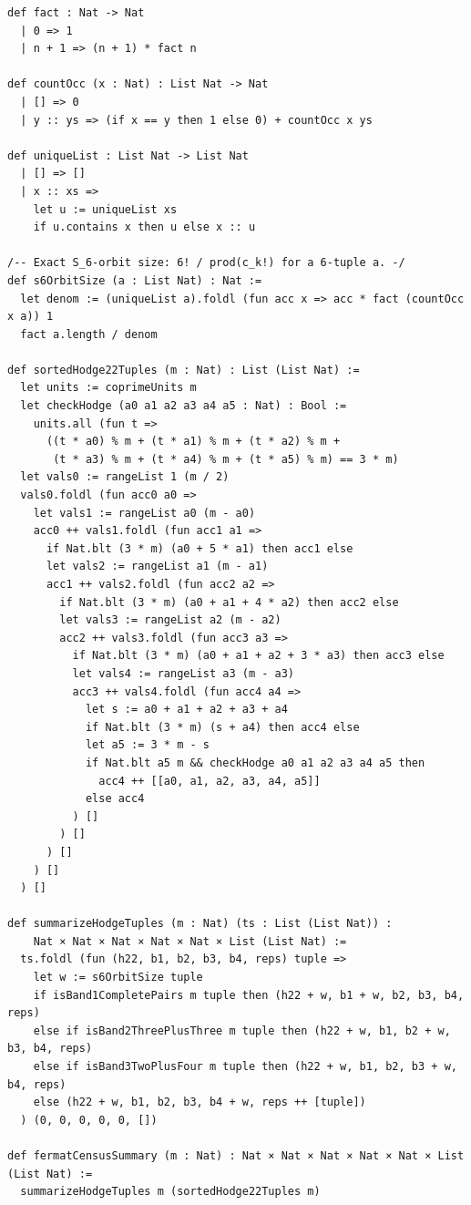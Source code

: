 \documentclass[11pt,a4paper]{article}
\begin{document}
\begin{lstlisting}[caption={Multinomial $S_6$-orbit size, sorted enumeration, and single-pass census.}]
def fact : Nat -> Nat
  | 0 => 1
  | n + 1 => (n + 1) * fact n

def countOcc (x : Nat) : List Nat -> Nat
  | [] => 0
  | y :: ys => (if x == y then 1 else 0) + countOcc x ys

def uniqueList : List Nat -> List Nat
  | [] => []
  | x :: xs =>
    let u := uniqueList xs
    if u.contains x then u else x :: u

/-- Exact S_6-orbit size: 6! / prod(c_k!) for a 6-tuple a. -/
def s6OrbitSize (a : List Nat) : Nat :=
  let denom := (uniqueList a).foldl (fun acc x => acc * fact (countOcc x a)) 1
  fact a.length / denom

def sortedHodge22Tuples (m : Nat) : List (List Nat) :=
  let units := coprimeUnits m
  let checkHodge (a0 a1 a2 a3 a4 a5 : Nat) : Bool :=
    units.all (fun t =>
      ((t * a0) % m + (t * a1) % m + (t * a2) % m +
       (t * a3) % m + (t * a4) % m + (t * a5) % m) == 3 * m)
  let vals0 := rangeList 1 (m / 2)
  vals0.foldl (fun acc0 a0 =>
    let vals1 := rangeList a0 (m - a0)
    acc0 ++ vals1.foldl (fun acc1 a1 =>
      if Nat.blt (3 * m) (a0 + 5 * a1) then acc1 else
      let vals2 := rangeList a1 (m - a1)
      acc1 ++ vals2.foldl (fun acc2 a2 =>
        if Nat.blt (3 * m) (a0 + a1 + 4 * a2) then acc2 else
        let vals3 := rangeList a2 (m - a2)
        acc2 ++ vals3.foldl (fun acc3 a3 =>
          if Nat.blt (3 * m) (a0 + a1 + a2 + 3 * a3) then acc3 else
          let vals4 := rangeList a3 (m - a3)
          acc3 ++ vals4.foldl (fun acc4 a4 =>
            let s := a0 + a1 + a2 + a3 + a4
            if Nat.blt (3 * m) (s + a4) then acc4 else
            let a5 := 3 * m - s
            if Nat.blt a5 m && checkHodge a0 a1 a2 a3 a4 a5 then
              acc4 ++ [[a0, a1, a2, a3, a4, a5]]
            else acc4
          ) []
        ) []
      ) []
    ) []
  ) []

def summarizeHodgeTuples (m : Nat) (ts : List (List Nat)) :
    Nat × Nat × Nat × Nat × Nat × List (List Nat) :=
  ts.foldl (fun (h22, b1, b2, b3, b4, reps) tuple =>
    let w := s6OrbitSize tuple
    if isBand1CompletePairs m tuple then (h22 + w, b1 + w, b2, b3, b4, reps)
    else if isBand2ThreePlusThree m tuple then (h22 + w, b1, b2 + w, b3, b4, reps)
    else if isBand3TwoPlusFour m tuple then (h22 + w, b1, b2, b3 + w, b4, reps)
    else (h22 + w, b1, b2, b3, b4 + w, reps ++ [tuple])
  ) (0, 0, 0, 0, 0, [])

def fermatCensusSummary (m : Nat) : Nat × Nat × Nat × Nat × Nat × List (List Nat) :=
  summarizeHodgeTuples m (sortedHodge22Tuples m)
\end{lstlisting}
\end{document}
